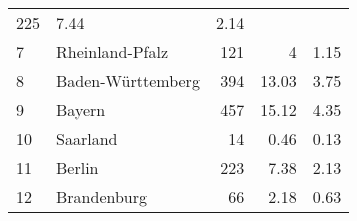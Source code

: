 \begin{longtable}{lXrrr}
       \num{225} &
       \num[round-mode=places,round-precision=2]{7,44} &
         \num[round-mode=places,round-precision=2]{2,14} \\

     7 &
     \multicolumn{1}{X}{ Rheinland-Pfalz   } &


       \num{121} &
       \num[round-mode=places,round-precision=2]{4} &
         \num[round-mode=places,round-precision=2]{1,15} \\

     8 &
     \multicolumn{1}{X}{ Baden-Württemberg   } &


       \num{394} &
       \num[round-mode=places,round-precision=2]{13,03} &
         \num[round-mode=places,round-precision=2]{3,75} \\

     9 &
     \multicolumn{1}{X}{ Bayern   } &


       \num{457} &
       \num[round-mode=places,round-precision=2]{15,12} &
         \num[round-mode=places,round-precision=2]{4,35} \\

     10 &
     \multicolumn{1}{X}{ Saarland   } &


       \num{14} &
       \num[round-mode=places,round-precision=2]{0,46} &
         \num[round-mode=places,round-precision=2]{0,13} \\

     11 &
     \multicolumn{1}{X}{ Berlin   } &


       \num{223} &
       \num[round-mode=places,round-precision=2]{7,38} &
         \num[round-mode=places,round-precision=2]{2,13} \\

     12 &
     \multicolumn{1}{X}{ Brandenburg   } &


       \num{66} &
       \num[round-mode=places,round-precision=2]{2,18} &
         \num[round-mode=places,round-precision=2]{0,63} \\


\end{longtable}
